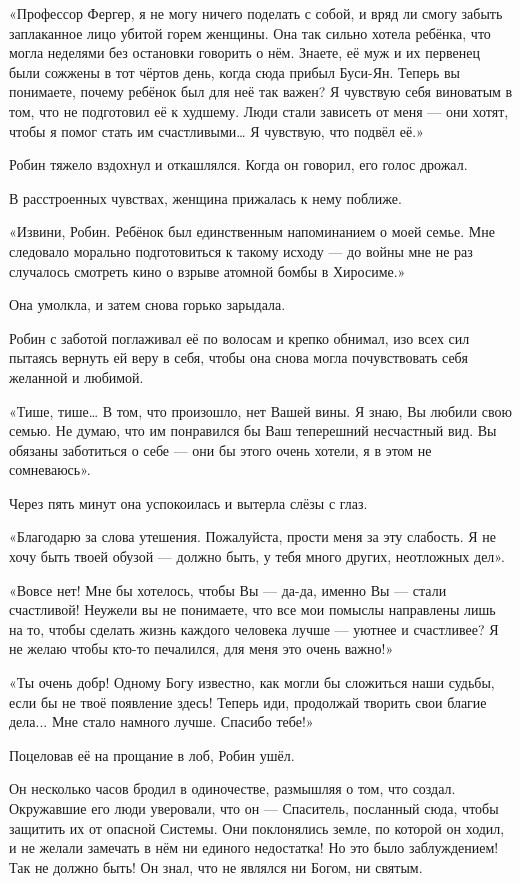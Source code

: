 \documentclass[a5paper, 9pt,
final, openany, twoside=true]{memoir}
\begin{document}
«Профессор Фергер, я не могу ничего поделать с собой, и вряд ли смогу забыть заплаканное лицо убитой горем женщины. Она так сильно хотела ребёнка, что могла неделями без остановки говорить о нём. Знаете, её муж и их первенец были сожжены в тот чёртов день, когда сюда прибыл Буси-Ян. Теперь вы понимаете, почему ребёнок был для неё так важен? Я чувствую себя виноватым в том, что не подготовил её к худшему. Люди стали зависеть от меня — они хотят, чтобы я помог стать им счастливыми… Я чувствую, что подвёл её.»

Робин тяжело вздохнул и откашлялся. Когда он говорил, его голос дрожал.

В расстроенных чувствах, женщина прижалась к нему поближе.

«Извини, Робин. Ребёнок был единственным напоминанием о моей семье. Мне следовало морально подготовиться к такому исходу — до войны мне не раз случалось смотреть кино о взрыве атомной бомбы в Хиросиме.»

Она умолкла, и затем снова горько зарыдала.

Робин с заботой поглаживал её по волосам и крепко обнимал, изо всех сил пытаясь вернуть ей веру в себя, чтобы она снова могла почувствовать себя желанной и любимой.

«Тише, тише… В том, что произошло, нет Вашей вины. Я знаю, Вы любили свою семью. Не думаю, что им понравился бы Ваш теперешний несчастный вид. Вы обязаны заботиться о себе — они бы этого очень хотели, я в этом не сомневаюсь».

Через пять минут она успокоилась и вытерла слёзы с глаз.

«Благодарю за слова утешения. Пожалуйста, прости меня за эту слабость. Я не хочу быть твоей обузой — должно быть, у тебя много других, неотложных дел».

«Вовсе нет! Мне бы хотелось, чтобы Вы — да-да, именно Вы — стали счастливой! Неужели вы не понимаете, что все мои помыслы направлены лишь на то, чтобы сделать жизнь каждого человека лучше — уютнее и счастливее? Я не желаю чтобы кто-то печалился, для меня это очень важно!»

«Ты очень добр! Одному Богу известно, как могли бы сложиться наши судьбы, если бы не твоё появление здесь! Теперь иди, продолжай творить свои благие дела... Мне стало намного лучше. Спасибо тебе!»

Поцеловав её на прощание в лоб, Робин ушёл.

Он несколько часов бродил в одиночестве, размышляя о том, что создал. Окружавшие его люди уверовали, что он — Спаситель, посланный сюда, чтобы защитить их от опасной Системы. Они поклонялись земле, по которой он ходил, и не желали замечать в нём ни единого недостатка! Но это было заблуждением! Так не должно быть! Он знал, что не являлся ни Богом, ни святым.\bigskip
\end{document}
